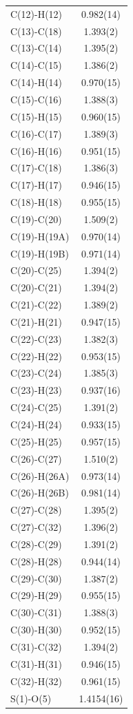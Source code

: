 \begin{center}
{\begin{supertabular}{p{1.5in}c}
C(12)-H(12) &0.982(14)\\
C(13)-C(18) &1.393(2)\\
C(13)-C(14) &1.395(2)\\
C(14)-C(15) &1.386(2)\\
C(14)-H(14) &0.970(15)\\
C(15)-C(16) &1.388(3)\\
C(15)-H(15) &0.960(15)\\
C(16)-C(17) &1.389(3)\\
C(16)-H(16) &0.951(15)\\
C(17)-C(18) &1.386(3)\\
C(17)-H(17) &0.946(15)\\
C(18)-H(18) &0.955(15)\\
C(19)-C(20) &1.509(2)\\
C(19)-H(19A) &0.970(14)\\
C(19)-H(19B) &0.971(14)\\
C(20)-C(25) &1.394(2)\\
C(20)-C(21) &1.394(2)\\
C(21)-C(22) &1.389(2)\\
C(21)-H(21) &0.947(15)\\
C(22)-C(23) &1.382(3)\\
C(22)-H(22) &0.953(15)\\
C(23)-C(24) &1.385(3)\\
C(23)-H(23) &0.937(16)\\
C(24)-C(25) &1.391(2)\\
C(24)-H(24) &0.933(15)\\
C(25)-H(25) &0.957(15)\\
C(26)-C(27) &1.510(2)\\
C(26)-H(26A) &0.973(14)\\
C(26)-H(26B) &0.981(14)\\
C(27)-C(28) &1.395(2)\\
C(27)-C(32) &1.396(2)\\
C(28)-C(29) &1.391(2)\\
C(28)-H(28) &0.944(14)\\
C(29)-C(30) &1.387(2)\\
C(29)-H(29) &0.955(15)\\
C(30)-C(31) &1.388(3)\\
C(30)-H(30) &0.952(15)\\
C(31)-C(32) &1.394(2)\\
C(31)-H(31) &0.946(15)\\
C(32)-H(32) &0.961(15)\\
S(1)-O(5) &1.4154(16)\\

\end{supertabular}}
\end{center}

